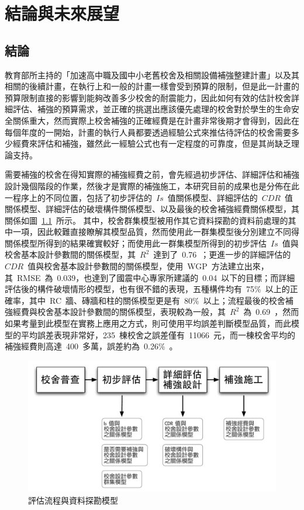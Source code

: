 \renewcommand\thetable{\arabic{chapter}-\arabic{table}}
\chapter{結論與未來展望}
\label{cha:conclusions}

\section{結論}

教育部所主持的「加速高中職及國中小老舊校舍及相關設備補強整建計畫」以及其相關的後續計畫，在執行上和一般的計畫一樣會受到預算的限制，但是此一計畫的預算限制直接的影響到能夠改善多少校舍的耐震能力，因此如何有效的估計校舍詳細評估、補強的預算需求，並正確的挑選出應該優先處理的校舍對於學生的生命安全關係重大，然而實際上校舍補強的正確經費是在計畫非常後期才會得到，因此在每個年度的一開始，計畫的執行人員都要透過經驗公式來推估待評估的校舍需要多少經費來評估和補強，雖然此一經驗公式也有一定程度的可靠度，但是其尚缺乏理論支持。

需要補強的校舍在得知實際的補強經費之前，會先經過初步評估、詳細評估和補強設計幾個階段的作業，然後才是實際的補強施工，本研究目前的成果也是分佈在此一程序上的不同位置，包括了初步評估的~$Is$~值關係模型、詳細評估的~$CDR$~值關係模型、詳細評估的破壞構件關係模型、以及最後的校舍補強經費關係模型，其關係如圖~\ref{fig:FLOW-con}~所示。
其中，校舍群集模型被用作其它資料探勘的資料前處理的其中一項，因此較難直接瞭解其模型品質，然而使用此一群集模型後分別建立不同得關係模型所得到的結果確實較好；而使用此一群集模型所得到的初步評估~$Is$~值與校舍基本設計參數間的關係模型，其~$R^2$~達到了~0.76~；更進一步的詳細評估的~$CDR$~值與校舍基本設計參數間的關係模型，使用~WGP~方法建立出來，其~RMSE~為~0.039，也達到了國震中心專家所建議的~0.04~以下的目標；而詳細評估後的構件破壞情形的模型，也有很不錯的表現，五種構件均有~75\%~以上的正確率，其中~RC~牆、磚牆和柱的關係模型更是有~80\%~以上；流程最後的校舍補強經費與校舍基本設計參數間的關係模型，表現較為一般，其~$R^2$~為~0.69~，然而如果考量到此模型在實務上應用之方式，則可使用平均誤差判斷模型品質，而此模型的平均誤差表現非常好，235~棟校舍之誤差僅有~11066~元，而一棟校舍平均的補強經費則高達~400~多萬，誤差約為~0.26\%~。

\begin{figure}[hbtp]
  \begin{center}
    \includegraphics[width=1.0\textwidth]{figures/survey-flow-con.pdf}
    \caption{評估流程與資料探勘模型} 
    \label{fig:FLOW-con}
  \end{center}
\end{figure}

